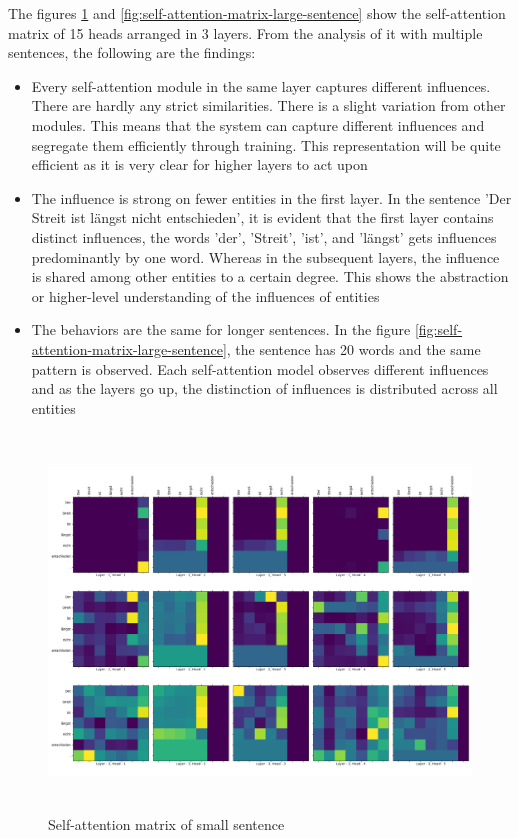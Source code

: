 \documentclass[a4paper, 11pt]{article}
\begin{document}
The figures \ref{fig:self-attention-matrix-small-sentence} and \ref{fig:self-attention-matrix-large-sentence} show the self-attention matrix of 15 heads arranged in 3 layers. From the analysis of it with multiple sentences, the following are the findings:

\begin{itemize}
\item Every self-attention module in the same layer captures different influences. There are hardly any strict similarities. There is a slight variation from other modules. This means that the system can capture different influences and segregate them efficiently through training. This representation will be quite efficient as it is very clear for higher layers to act upon 
\item  The influence is strong on fewer entities in the first layer. In the sentence 'Der Streit ist längst nicht entschieden', it is evident that the first layer contains distinct influences, the words 'der', 'Streit', 'ist', and 'längst' gets influences predominantly by one word. Whereas in the subsequent layers, the influence is shared among other entities to a certain degree. This shows the abstraction or higher-level understanding of the influences of entities

\item The behaviors are the same for longer sentences. In the figure \ref{fig:self-attention-matrix-large-sentence}, the sentence has 20 words and the same pattern is observed. Each self-attention model observes different influences and as the layers go up, the distinction of influences is distributed across all entities
\end{itemize}

\begin{figure}[H]
    \centering
    \includegraphics[width=\textwidth,height=10cm,keepaspectratio=true]
    {self-attention-matrix-1.png}
    \caption{
        Self-attention matrix of small sentence
    }
    \label{fig:self-attention-matrix-small-sentence}
\end{figure}
\end{document}
